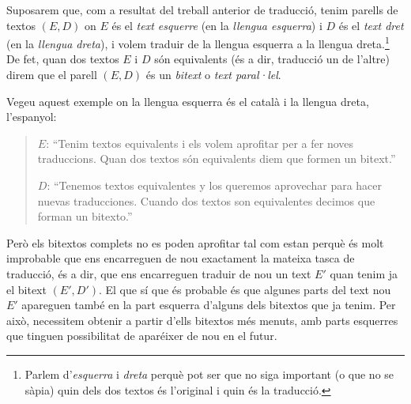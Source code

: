 Suposarem que, com a resultat del treball anterior de traducció, tenim
parells de textos $(E,D)$ on $E$ és el \emph{text esquerre} (en la
\emph{llengua esquerra}) i $D$ és el \emph{text dret} (en la
\emph{llengua dreta}), i volem traduir de la llengua esquerra a la
llengua dreta.\footnote{Parlem d'\emph{esquerra} i \emph{dreta} perquè
  pot ser que no siga important (o que no se sàpia) quin dels dos
  textos és l'original i quin és la traducció.}  De fet, quan dos
textos $E$ i $D$ són equivalents (és a dir, traducció un de l'altre)
direm que el parell $(E,D)$ és un \emph{bitext} o \emph{text
  paral·lel}.

Vegeu aquest exemple on la llengua esquerra és el català i la llengua
dreta, l'espanyol:
\begin{quote}
  $E$: ``Tenim textos equivalents i els volem aprofitar per a fer
  noves traduccions. Quan dos textos són equivalents diem que formen
  un bitext.''

  $D$: ``Tenemos textos equivalentes y los queremos aprovechar para
  hacer nuevas traducciones. Cuando dos textos son equivalentes
  decimos que forman un bitexto.''
\end{quote}

Però els bitextos complets no es poden aprofitar tal com estan perquè
és molt improbable que ens encarreguen de nou exactament la mateixa
tasca de traducció, és a dir, que ens encarreguen traduir de nou un
text $E'$ quan tenim ja el bitext $(E',D')$. El que sí que és probable
és que algunes parts del text nou $E'$ apareguen també en la part
esquerra d'alguns dels bitextos que ja tenim. Per això, necessitem
obtenir a partir d'ells bitextos més menuts, amb parts esquerres que
tinguen possibilitat de aparéixer de nou en el futur.

